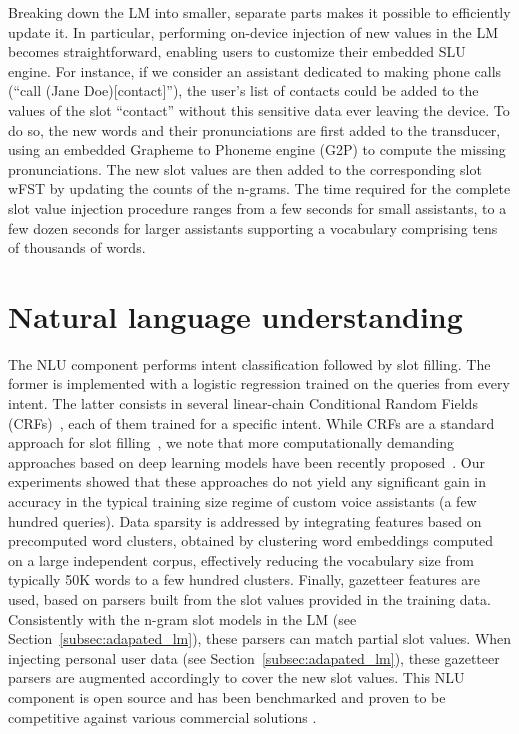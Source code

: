 \documentclass{article}
\begin{document}
Breaking down the LM into smaller, separate parts makes it possible to efficiently update it. 
  In particular, performing on-device injection of new values in the LM becomes straightforward, enabling users to customize their embedded SLU engine. 
  For instance, if we consider an assistant dedicated to making phone calls (``call (Jane Doe)[contact]''), the user's list of contacts could be added to the values of the slot ``contact'' without this sensitive data ever leaving the device. 
  To do so, the new words and their pronunciations are first added to the  transducer, using an embedded Grapheme to Phoneme engine (G2P) to compute the missing pronunciations. 
  The new slot values are then added to the corresponding slot wFST  by updating the counts of the n-grams. 
  The time required for the complete slot value injection procedure ranges from a few seconds for small assistants, to a few dozen seconds for larger assistants supporting a vocabulary comprising tens of thousands of words.


\section{Natural language understanding}
\label{sec:nlu}

  The NLU component performs intent classification followed by slot filling. 
  The former is implemented with a logistic regression trained on the queries from every intent. 
  The latter consists in several linear-chain Conditional Random Fields (CRFs)~\cite{crf01}, each of them trained for a specific intent. 
While CRFs are a standard approach for slot filling~\cite{crfinslu1}, we note that more computationally demanding approaches based on deep learning models have been recently proposed~\cite{mesnil2015using}. 
  Our experiments showed that these approaches do not yield any significant gain in accuracy in the typical training size regime of custom voice assistants (a few hundred queries).
  Data sparsity is addressed by integrating features based on precomputed word clusters, obtained by clustering word embeddings computed on a large independent corpus, effectively reducing the vocabulary size from typically 50K words to a few hundred clusters.
  Finally, gazetteer features are used, based on parsers built from the slot values provided in the training data. 
  Consistently with the n-gram slot models  in the LM (see Section~\ref{subsec:adapated_lm}), these parsers can match partial slot values. 
  When injecting personal user data (see Section~\ref{subsec:adapated_lm}), these gazetteer parsers are augmented accordingly to cover the new slot values.
  This NLU component is open source and has been benchmarked and proven to be competitive against various commercial solutions \cite{coucke2018snips}.
\end{document}
